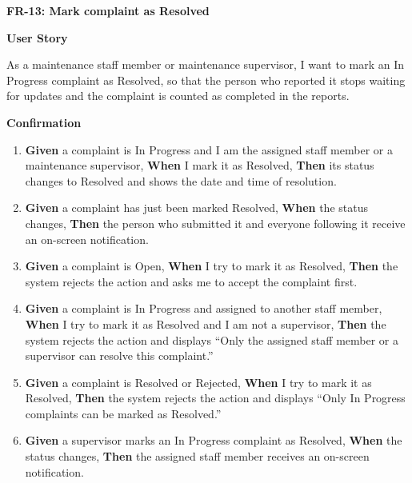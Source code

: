 \noindent\textbf{FR-13: Mark complaint as Resolved}\par\nopagebreak[4]\smallskip
\noindent\textbf{User Story}\par\nopagebreak[4]
\noindent As a maintenance staff member or maintenance supervisor, I want to mark an In Progress complaint as Resolved, so that the person who reported it stops waiting for updates and the complaint is counted as completed in the reports.\par\smallskip
{\makeatletter
{}
\makeatother
\noindent\textbf{Confirmation}\par\nopagebreak[4]\vspace{-6pt}\nopagebreak[4]
\begin{enumerate}\setlength{\itemsep}{2pt}\setlength{\parsep}{0pt}\setlength{\topsep}{2pt}\setlength{\partopsep}{0pt}
  \item \textbf{Given} a complaint is In Progress and I am the assigned staff member or a maintenance supervisor, \textbf{When} I mark it as Resolved, \textbf{Then} its status changes to Resolved and shows the date and time of resolution.
  \item \textbf{Given} a complaint has just been marked Resolved, \textbf{When} the status changes, \textbf{Then} the person who submitted it and everyone following it receive an on-screen notification.
  \item \textbf{Given} a complaint is Open, \textbf{When} I try to mark it as Resolved, \textbf{Then} the system rejects the action and asks me to accept the complaint first.
  \item \textbf{Given} a complaint is In Progress and assigned to another staff member, \textbf{When} I try to mark it as Resolved and I am not a supervisor, \textbf{Then} the system rejects the action and displays ``Only the assigned staff member or a supervisor can resolve this complaint.''
  \item \textbf{Given} a complaint is Resolved or Rejected, \textbf{When} I try to mark it as Resolved, \textbf{Then} the system rejects the action and displays ``Only In Progress complaints can be marked as Resolved.''
  \item \textbf{Given} a supervisor marks an In Progress complaint as Resolved, \textbf{When} the status changes, \textbf{Then} the assigned staff member receives an on-screen notification.
\end{enumerate}}
\medskip
 
